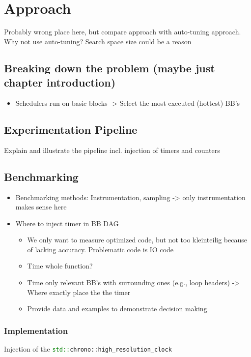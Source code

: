 \chapter{Approach}
Probably wrong place here, but compare approach with auto-tuning approach.
Why not use auto-tuning? Search space size could be a reason

\section{Breaking down the problem (maybe just chapter introduction)}
\begin{itemize}
    \item Schedulers run on basic blocks -> Select the most executed (hottest) BB's
\end{itemize}

\section{Experimentation Pipeline}
Explain and illustrate the pipeline incl. injection of timers and counters

\section{Benchmarking}
\begin{itemize}
    \item Benchmarking methods: Instrumentation, sampling -> only instrumentation makes sense here
    \item Where to inject timer in BB DAG
    \begin{itemize}
        \item We only want to measure optimized code, but not too kleinteilig because of lacking accuracy. Problematic code is IO code
        \item Time whole function?
        \item Time only relevant BB's with surrounding ones (e.g., loop headers) -> Where exactly place the the timer
        \item Provide data and examples to demonstrate decision making
    \end{itemize} 
\end{itemize}
\subsection{Implementation}
Injection of the \lstinline[language=C++]|std::chrono::high_resolution_clock|
